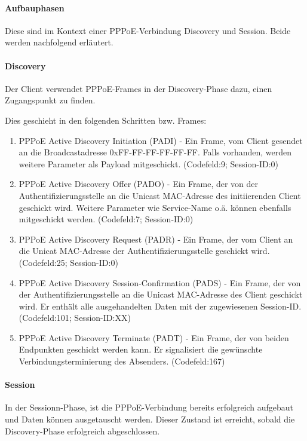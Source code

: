\paragraph{Aufbauphasen}
Diese sind im Kontext einer PPPoE-Verbindung Discovery und Session.
Beide werden nachfolgend erläutert.

\paragraph{Discovery}
Der Client verwendet PPPoE-Frames in der Discovery-Phase dazu, einen
Zugangspunkt zu finden.

Dies geschieht in den folgenden Schritten bzw. Frames:
\begin{enumerate}
\item PPPoE Active Discovery Initiation (PADI) - Ein Frame, vom Client
      gesendet an die Broadcastadresse 0xFF-FF-FF-FF-FF-FF.
      Falls vorhanden, werden weitere Parameter als Payload 
      mitgeschickt. (Codefeld:9; Session-ID:0)
\item PPPoE Active Discovery Offer (PADO) - Ein Frame, der von der
      Authentifizierungsstelle an die Unicast MAC-Adresse des
      initiierenden Client geschickt wird. Weitere Parameter wie
      Service-Name o.ä. können ebenfalls mitgeschickt
      werden. (Codefeld:7; Session-ID:0)
\item PPPoE Active Discovery Request (PADR) - Ein Frame, der vom Client
      an die Unicat MAC-Adresse der Authentifizierungsstelle geschickt
      wird. (Codefeld:25; Session-ID:0)
\item PPPoE Active Discovery Session-Confirmation (PADS) - Ein Frame,
      der von der Authentifizierungsstelle an die Unicast MAC-Adresse
      des Client geschickt wird. Er enthält alle ausgehandelten Daten
      mit der zugewiesenen Session-ID. (Codefeld:101; Session-ID:XX)
\item PPPoE Active Discovery Terminate (PADT) - Ein Frame,
      der von beiden Endpunkten geschickt werden kann. Er signalisiert
      die gewünschte Verbindungsterminierung des Absenders.
      (Codefeld:167)
\end{enumerate}

\paragraph{Session}
In der Sessionn-Phase, ist die PPPoE-Verbindung bereits erfolgreich
aufgebaut und Daten können ausgetauscht werden.
Dieser Zustand ist erreicht, sobald die Discovery-Phase
erfolgreich abgeschlossen.

